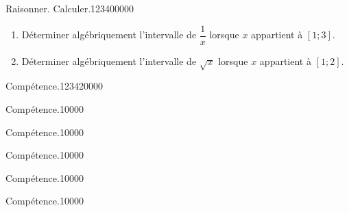 \begin{pageAD}
\begin{ExoCad}{Raisonner. Calculer.}{1234}{0}{0}{0}{0}{0}
\begin{enumerate}[leftmargin=*]
\item Déterminer algébriquement l'intervalle de $\dfrac{1}{x}$ lorsque $x$ appartient à $[1;3]$. 

\item Déterminer algébriquement l'intervalle de $\sqrt{x}$ lorsque $x$ appartient à $\left[1;2 \right]$. 

\end{enumerate}

\end{ExoCad}
 
\end{pageAD} %


\begin{pageParcoursu} %

\begin{ExoCu}{Compétence.}{1234}{2}{0}{0}{0}{0}
  
\end{ExoCu}

\begin{ExoCuN}{Compétence.}{1}{0}{0}{0}{0}

\end{ExoCuN}

\begin{ExoCuN}{Compétence.}{1}{0}{0}{0}{0}

\end{ExoCuN}

\begin{ExoCuN}{Compétence.}{1}{0}{0}{0}{0}

\end{ExoCuN}

\begin{ExoCuN}{Compétence.}{1}{0}{0}{0}{0}

\end{ExoCuN}

\begin{ExoCuN}{Compétence.}{1}{0}{0}{0}{0}

\end{ExoCuN}


\end{pageParcoursu} %
 
